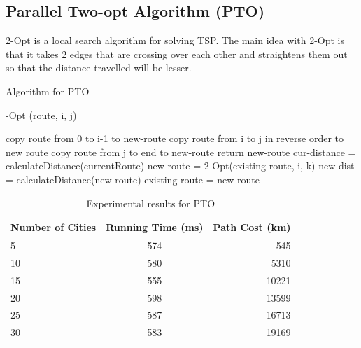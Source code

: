 \documentclass[conference]{IEEEtran}
\begin{document}
\subsection {Parallel Two-opt Algorithm (PTO)}
2-Opt is a local search algorithm for solving TSP. The main idea with 2-Opt is that it takes 2 edges that are crossing over each other and straightens them out so that the distance travelled will be lesser.



\newlength\myindent
\setlength\myindent{2em}
\newcommand\bindent{%
  \begingroup
  \setlength{\itemindent}{\myindent}
  \addtolength{\algorithmicindent}{\myindent}
}
\newcommand\eindent{\endgroup}
\begin{algorithm}[H]
\caption{Algorithm for PTO}
\begin{algorithmic}[1]
-Opt (route, i, j)
\bindent
\STATE copy route from 0 to i-1 to new-route
\STATE copy route from i to j in reverse order to new route
\STATE copy route from j to end to new-route
\STATE return new-route
\eindent
\REPEAT
\STATE cur-distance = calculateDistance(currentRoute)
\STATE new-route = 2-Opt(existing-route, i, k)
\STATE new-dist = calculateDistance(new-route)
\STATE existing-route = new-route
\ENDIF
\ENDFOR
\ENDFOR 
{}
\end{algorithmic}
\end{algorithm} 




\begin{table}[h!]
  \begin{center}
    \label{tab:table3} \caption{Experimental results for PTO}
    \begin{tabular}{l|c|r}
      \textbf{Number of Cities} & \textbf{Running Time (ms)} & \textbf{Path Cost (km)}\\
      \hline
      5 & 574 & 545\\
      10 & 580 & 5310\\
      15 & 555 & 10221\\
      20 & 598 & 13599\\ 
      25 & 587 & 16713\\
      30 & 583 & 19169\\
    \end{tabular}
  \end{center}
\end{table}
\end{document}
